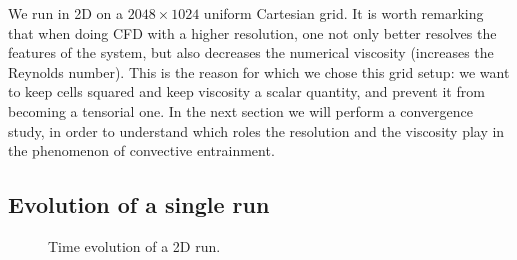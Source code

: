 We run in 2D on a $2048 \times 1024$ uniform Cartesian grid. It is worth remarking that when doing CFD with a higher resolution, one not only better resolves the features of the system, but also decreases the numerical viscosity (increases the Reynolds number). This is the reason for which we chose this grid setup: we want to keep cells squared and keep viscosity a scalar quantity, and prevent it from becoming a tensorial one. In the next section we will perform a convergence study, in order to understand which roles the resolution and the viscosity play in the phenomenon of convective entrainment.


\subsection{Evolution of a single run}



\begin{figure}[t]
      \centering
     \centering
	\hfill
	\caption{Time evolution of a 2D run.}
	\label{2dsingle}
\end{figure}

